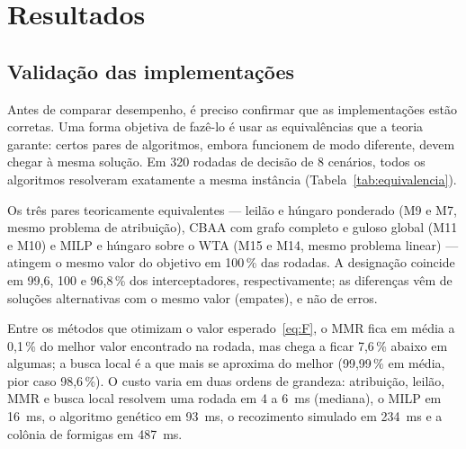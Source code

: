 \section{Resultados}\label{sec:resultados}

\subsection{Validação das implementações}\label{sec:validacao}
Antes de comparar desempenho, é preciso confirmar que as implementações estão corretas. Uma forma objetiva de fazê-lo é
usar as equivalências que a teoria garante: certos pares de algoritmos, embora funcionem de modo diferente, devem chegar
à mesma solução. Em 320 rodadas de decisão de 8 cenários, todos os algoritmos resolveram exatamente a mesma instância
(Tabela~\ref{tab:equivalencia}).

Os três pares teoricamente equivalentes --- leilão e húngaro ponderado (M9 e M7, mesmo problema de atribuição), CBAA com
grafo completo e guloso global (M11 e M10) e MILP e húngaro sobre o WTA (M15 e M14, mesmo problema linear) --- atingem o
mesmo valor do objetivo em 100\,\% das rodadas. A designação coincide em 99,6, 100 e 96,8\,\% dos interceptadores,
respectivamente; as diferenças vêm de soluções alternativas com o mesmo valor (empates), e não de erros.

Entre os métodos que otimizam o valor esperado~\eqref{eq:F}, o MMR fica em média a 0,1\,\% do melhor valor encontrado
na rodada, mas chega a ficar 7,6\,\% abaixo em algumas; a busca local é a que mais se aproxima do melhor (99,99\,\% em
média, pior caso 98,6\,\%). O custo varia em duas ordens de grandeza: atribuição, leilão, MMR e busca local resolvem uma
rodada em 4 a 6~ms (mediana), o MILP em 16~ms, o algoritmo genético em 93~ms, o recozimento simulado em 234~ms e a colônia
de formigas em 487~ms.


